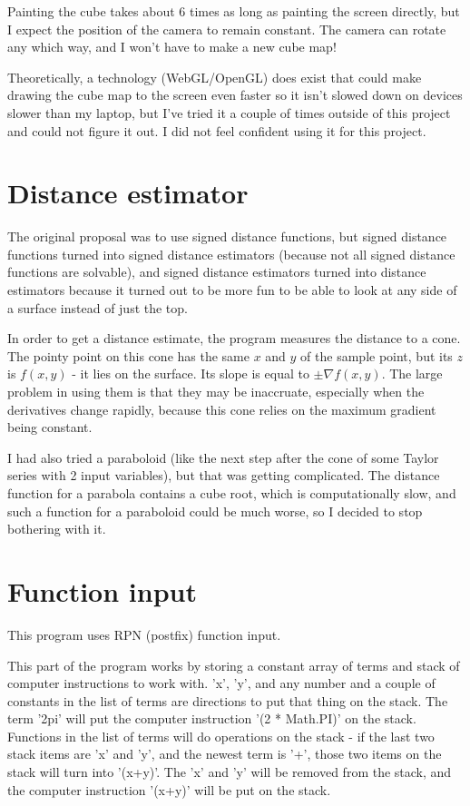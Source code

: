 Painting the cube takes about 6 times as long as painting the screen directly, but I expect the position of the camera to remain constant.  The camera can rotate any which way, and I won't have to make a new cube map!

Theoretically, a technology (WebGL/OpenGL) does exist that could make drawing the cube map to the screen even faster so it isn't slowed down on devices slower than my laptop, but I've tried it a couple of times outside of this project and could not figure it out.  I did not feel confident using it for this project.

\section*{Distance estimator}

The original proposal was to use signed distance functions, but signed distance functions turned into signed distance estimators (because not all signed distance functions are solvable), and signed distance estimators turned into distance estimators because it turned out to be more fun to be able to look at any side of a surface instead of just the top.

In order to get a distance estimate, the program measures the distance to a cone.  The pointy point on this cone has the same $x$ and $y$ of the sample point, but its $z$ is $f(x,y)$ - it lies on the surface.  Its slope is equal to $\pm\nabla f(x,y)$.  The large problem in using them is that they may be inaccruate, especially when the derivatives change rapidly, because this cone relies on the maximum gradient being constant.

I had also tried a paraboloid (like the next step after the cone of some Taylor series with 2 input variables), but that was getting complicated.  The distance function for a parabola contains a cube root, which is computationally slow, and such a function for a paraboloid could be much worse, so I decided to stop bothering with it.

\section*{Function input}

This program uses RPN (postfix) function input.

This part of the program works by storing a constant array of terms and stack of computer instructions to work with.  'x', 'y', and any number and a couple of constants in the list of terms are directions to put that thing on the stack.  The term '2pi' will put the computer instruction '(2 * Math.PI)' on the stack.  Functions in the list of terms will do operations on the stack - if the last two stack items are 'x' and 'y', and the newest term is '+', those two items on the stack will turn into '(x+y)'.  The 'x' and 'y' will be removed from the stack, and the computer instruction '(x+y)' will be put on the stack.

